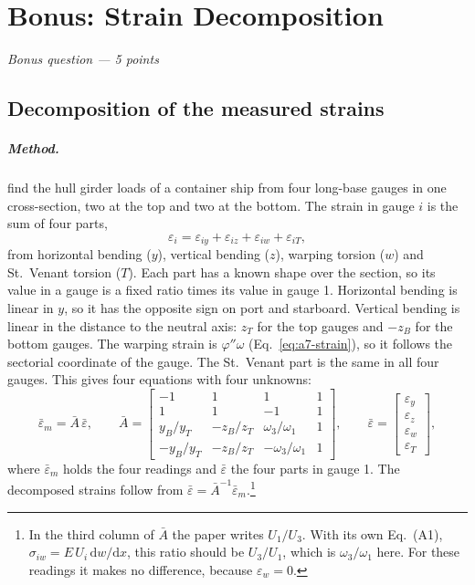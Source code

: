 \chapter{Bonus: Strain Decomposition}
\label{ch:bonus}

\begingroup\itshape Bonus question --- 5 points\endgroup


\section{Decomposition of the measured strains}
\label{sec:b1-1}

\paragraph{Method.} \textcite{ChoiKang2003} find the hull girder loads of a container ship from four long-base gauges in one cross-section, two at the top and two at the bottom. The strain in gauge $i$ is the sum of four parts,
\begin{equation}
  \varepsilon_i = \varepsilon_{iy} + \varepsilon_{iz} + \varepsilon_{iw} + \varepsilon_{iT} ,
  \label{eq:b-sum}
\end{equation}
from horizontal bending ($y$), vertical bending ($z$), warping torsion ($w$) and St.\ Venant torsion ($T$). Each part has a known shape over the section, so its value in a gauge is a fixed ratio times its value in gauge 1. Horizontal bending is linear in $y$, so it has the opposite sign on port and starboard. Vertical bending is linear in the distance to the neutral axis: $z_T$ for the top gauges and $-z_B$ for the bottom gauges. The warping strain is $\varphi''\omega$ (Eq.~\ref{eq:a7-strain}), so it follows the sectorial coordinate of the gauge. The St.\ Venant part is the same in all four gauges. This gives four equations with four unknowns:
\begin{equation}
  \bar\varepsilon_m = \bar A\,\bar\varepsilon , \qquad
  \bar A =
  \begin{bmatrix}
    -1 & 1 & 1 & 1\\
    1 & 1 & -1 & 1\\
    y_B/y_T & -z_B/z_T & \omega_3/\omega_1 & 1\\
    -y_B/y_T & -z_B/z_T & -\omega_3/\omega_1 & 1
  \end{bmatrix} , \qquad
  \bar\varepsilon =
  \begin{bmatrix} \varepsilon_y\\ \varepsilon_z\\ \varepsilon_w\\ \varepsilon_T \end{bmatrix} ,
  \label{eq:b-system}
\end{equation}
where $\bar\varepsilon_m$ holds the four readings and $\bar\varepsilon$ the four parts in gauge 1. The decomposed strains follow from $\bar\varepsilon = \bar A^{-1}\bar\varepsilon_m$.\footnote{In the third column of $\bar A$ the paper writes $U_1/U_3$. With its own Eq.~(A1), $\sigma_{iw} = E\,U_i\,\mathrm{d}w/\mathrm{d}x$, this ratio should be $U_3/U_1$, which is $\omega_3/\omega_1$ here. For these readings it makes no difference, because $\varepsilon_w = 0$.}

